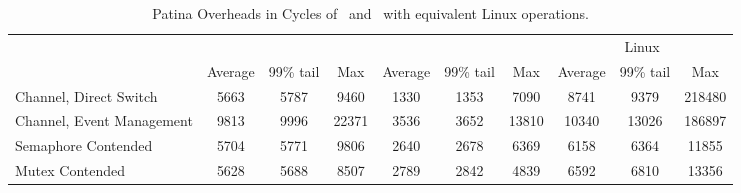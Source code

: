 

\begin{table*}[t]
    \centering
	\begin{tabular}{l|c|c|c|c|c|c|c|c|c} \hline
		& \multicolumn{3}{c|}{\cos} & \multicolumn{3}{c|}{\name} & \multicolumn{3}{c}{Linux}\\
			  & Average & 99\% tail & Max & Average & 99\% tail & Max & Average & 99\% tail & Max\\ \hline
		Channel, Direct Switch & 5663 & 5787 & 9460 & 1330 & 1353 & 7090 & 8741 & 9379 & 218480 \\
		Channel, Event Management & 9813 & 9996 & 22371 & 3536 & 3652 & 13810 & 10340 & 13026 & 186897 \\ \hline
		Semaphore Contended & 5704 & 5771 & 9806 & 2640 & 2678 & 6369 & 6158 & 6364 & 11855 \\ \hline
		Mutex Contended & 5628 & 5688 & 8507 & 2789 & 2842 & 4839 & 6592 & 6810 & 13356 \\ \hline
        \end{tabular}
	\caption{\small Patina Overheads in Cycles of \name\ and \cos\ with equivalent Linux operations.}
    \label{tbl:patina}
\end{table*}

